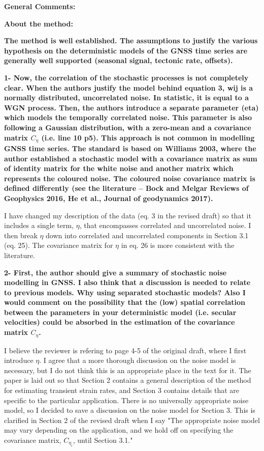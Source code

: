 \documentclass[10pt,a4paper]{letter}
\begin{document}
\begin{letter}{}
\textbf{General Comments:}

\textbf{About the method:}

\textbf{The method is well established. The assumptions to justify the various
hypothesis on the deterministic models of the GNSS time series are
generally well supported (seasonal signal, tectonic rate, offsets).}

\textbf{1- Now, the correlation of the stochastic processes is not completely
clear. When the authors justify the model behind equation 3, wij is a
normally distributed, uncorrelated noise. In statistic, it is equal to
a WGN process. Then, the authors introduce a separate parameter (eta)
which models the temporally correlated noise. This parameter is also
following a Gaussian distribution, with a zero-mean and a covariance
matrix $C_{\eta}$ (i.e. line 10 p5). This approach is not common in
modelling GNSS time series. The standard is based on Williams 2003,
where the author established a stochastic model with a covariance
matrix as sum of identity matrix for the white noise and another
matrix which represents the coloured noise. The coloured noise
covariance matrix is defined differently (see the literature – Bock and
Melgar Reviews of Geophysics 2016, He et al., Journal of geodynamics
2017).}

I have changed my description of the data (eq. 3 in the revised draft)
so that it includes a single term, $\eta$, that encompasses correlated
and uncorrelated noise. I then break $\eta$ down into correlated and
uncorrelated components in Section 3.1 (eq. 25). The covariance matrix
for $\eta$ in eq. 26 is more consistent with the literature.

\textbf{2- First, the author should give a summary of stochastic noise
modelling in GNSS. I also think that a discussion is needed to relate
to previous models. Why using separated stochastic models? Also I
would comment on the possibility that the (low) spatial correlation
between the parameters in your deterministic model (i.e. secular
velocities) could be absorbed in the estimation of the covariance
matrix $C_{\eta}$.}

I believe the reviewer is refering to page 4-5 of the original draft,
where I first introduce $\eta$. I agree that a more thorough
discussion on the noise model is necessary, but I do not think this is
an appropriate place in the text for it. The paper is laid out so that
Section 2 contains a general description of the method for estimating
transient strain rates, and Section 3 contains details that are
specific to the particular application. There is no universally
appropriate noise model, so I decided to save a discussion on the
noise model for Section 3. This is clarified in Section 2 of the
revised draft when I say "The appropriate noise model may vary
depending on the application, and we hold off on specifying the
covariance matrix, $C_{\eta_i}$, until Section 3.1."


\end{letter}
\end{document}
